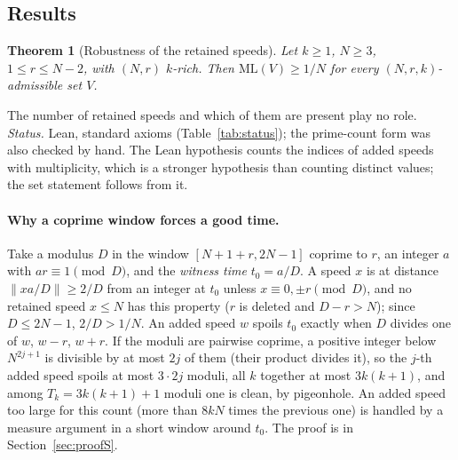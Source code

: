 \documentclass[11pt]{article}
\newtheorem{theorem}{Theorem}[section]
\theoremstyle{definition}
\theoremstyle{remark}
\newcommand{\nd}[1]{\lVert #1\rVert}
\newcommand{\ML}{\mathrm{ML}}
\begin{document}
\subsection{Results}\label{sec:results}
\begin{theorem}[Robustness of the retained speeds]\label{thm:S}
Let $k\ge1$, $N\ge3$, $1\le r\le N-2$, with $(N,r)$ $k$-rich. Then $\ML(V)\ge1/N$ for every $(N,r,k)$-admissible set $V$.
\end{theorem}
The number of retained speeds and which of them are present play no role. \emph{Status.} Lean, standard axioms (Table~\ref{tab:status}); the prime-count form was also checked by hand. The Lean hypothesis counts the indices of added speeds with multiplicity, which is a stronger hypothesis than counting distinct values; the set statement follows from it.

\paragraph{Why a coprime window forces a good time.} Take a modulus $D$ in the window $[N+1+r,2N-1]$ coprime to $r$, an integer $a$ with $ar\equiv1\pmod D$, and the \emph{witness time} $t_0=a/D$. A speed $x$ is at distance $\nd{xa/D}\ge2/D$ from an integer at $t_0$ unless $x\equiv0,\pm r\pmod D$, and no retained speed $x\le N$ has this property ($r$ is deleted and $D-r>N$); since $D\le2N-1$, $2/D>1/N$. An added speed $w$ spoils $t_0$ exactly when $D$ divides one of $w$, $w-r$, $w+r$. If the moduli are pairwise coprime, a positive integer below $N^{2j+1}$ is divisible by at most $2j$ of them (their product divides it), so the $j$-th added speed spoils at most $3\cdot2j$ moduli, all $k$ together at most $3k(k+1)$, and among $T_k=3k(k+1)+1$ moduli one is clean, by pigeonhole. An added speed too large for this count (more than $8kN$ times the previous one) is handled by a measure argument in a short window around $t_0$. The proof is in Section~\ref{sec:proofS}.
\end{document}
